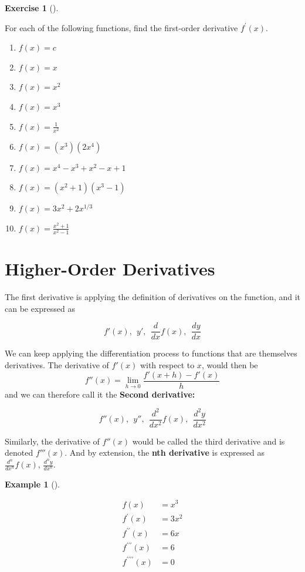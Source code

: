\documentclass[
  letterpaper,
]{book}
\providecommand{\tightlist}{%
  \setlength{\itemsep}{0pt}\setlength{\parskip}{0pt}}\usepackage{longtable,booktabs,array}
\theoremstyle{definition}
\theoremstyle{definition}
\newtheorem{example}{Example}[chapter]
\theoremstyle{plain}
\theoremstyle{definition}
\newtheorem{exercise}{Exercise}[chapter]
\theoremstyle{plain}
\theoremstyle{plain}
\theoremstyle{remark}
\begin{document}
\leavevmode{}%
\begin{exercise}[]\label{exr-introderivatives}

For each of the following functions, find the first-order derivative
\(f^\prime(x)\).

\begin{enumerate}
\def\labelenumi{\arabic{enumi}.}
\tightlist
\item
  \(f(x)=c\)
\item
  \(f(x)=x\)
\item
  \(f(x)=x^2\)
\item
  \(f(x)=x^3\)
\item
  \(f(x)=\frac{1}{x^2}\)
\item
  \(f(x)=(x^3)(2x^4)\)
\item
  \(f(x) = x^4 - x^3 + x^2 - x + 1\)
\item
  \(f(x) = (x^2 + 1)(x^3 - 1)\)
\item
  \(f(x) = 3x^2 + 2x^{1/3}\)
\item
  \(f(x)=\frac{x^2+1}{x^2-1}\)
\end{enumerate}

\end{exercise}

\hypertarget{derivpoly}{%
\section{Higher-Order Derivatives}\label{derivpoly}}

The first derivative is applying the definition of derivatives on the
function, and it can be expressed as

\[f'(x),  ~~ y',  ~~ \frac{d}{dx}f(x), ~~ \frac{dy}{dx}\]

We can keep applying the differentiation process to functions that are
themselves derivatives. The derivative of \(f'(x)\) with respect to
\(x\), would then be
\[f''(x)=\lim\limits_{h\to 0}\frac{f'(x+h)-f'(x)}{h}\] and we can
therefore call it the \textbf{Second derivative:}

\[f''(x), ~~ y'', ~~ \frac{d^2}{dx^2}f(x), ~~ \frac{d^2y}{dx^2}\]

Similarly, the derivative of \(f''(x)\) would be called the third
derivative and is denoted \(f'''(x)\). And by extension, the \textbf{nth
derivative} is expressed as \(\frac{d^n}{dx^n}f(x)\),
\(\frac{d^ny}{dx^n}\).

\leavevmode{}%
\begin{example}[]\label{exm-succ-der}

\[\begin{align*}
f(x) &=x^3\\
f^{\prime}(x) &=3x^2\\
f^{\prime\prime}(x) &=6x \\
f^{\prime\prime\prime}(x) &=6\\
f^{\prime\prime\prime\prime}(x) &=0\\
\end{align*}\]

\end{example}
\end{document}
